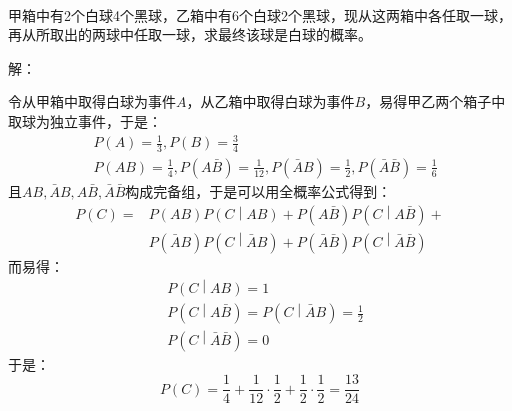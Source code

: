 ~

\begin{example}
甲箱中有2个白球4个黑球，乙箱中有6个白球2个黑球，现从这两箱中各任取一球，再从所取出的两球中任取一球，求最终该球是白球的概率。
\end{example}

解：

令从甲箱中取得白球为事件$A$，从乙箱中取得白球为事件$B$，易得甲乙两个箱子中取球为独立事件，于是：
\begin{align*}
&P\left( A \right) =\frac{1}{3},P\left( B \right) =\frac{3}{4} \\
&P\left( AB \right) =\frac{1}{4},P\left( A\bar{B} \right) =\frac{1}{12},P\left( \bar{A}B \right) =\frac{1}{2},P\left( \bar{A}\bar{B} \right) =\frac{1}{6}
\end{align*}
且$AB,\bar{A}B,A\bar{B},\bar{A}\bar{B}$构成完备组，于是可以用全概率公式得到：
\begin{align*}
P\left( C \right) =&P\left( AB \right) P\left( C \middle| AB \right) +P\left( A\bar{B} \right) P\left( C \middle| A\bar{B} \right) + \\
&P\left( \bar{A}B \right) P\left( C \middle| \bar{A}B \right) +P\left( \bar{A}\bar{B} \right) P\left( C \middle| \bar{A}\bar{B} \right)
\end{align*}
而易得：
\begin{align*}
&P\left( C \middle| AB \right) =1 \\
&P\left( C \middle| A\bar{B} \right) =P\left( C \middle| \bar{A}B \right) =\frac{1}{2} \\
&P\left( C \middle| \bar{A}\bar{B} \right) =0
\end{align*}
于是：
\[
P\left( C \right) =\frac{1}{4}+\frac{1}{12}\cdot \frac{1}{2}+\frac{1}{2}\cdot \frac{1}{2}=\frac{13}{24}
\]




